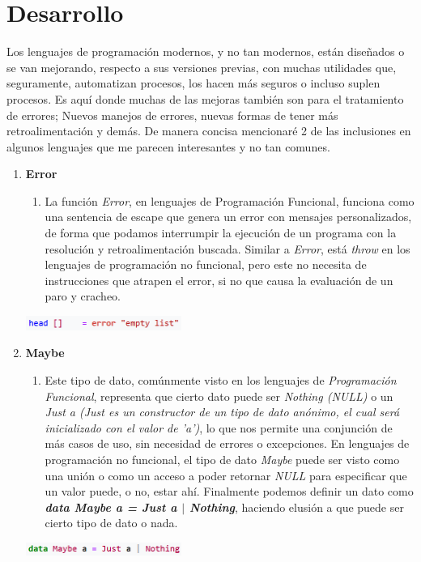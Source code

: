 \documentclass{dense_template}
\begin{document}
\section{Desarrollo}
Los lenguajes de programación modernos, y no tan modernos, están diseñados o se van mejorando, respecto a sus versiones previas, con muchas utilidades que, seguramente, automatizan procesos, los hacen más seguros o incluso suplen procesos. Es aquí donde muchas de las mejoras también son para el tratamiento de errores; Nuevos manejos de errores, nuevas formas de tener más retroalimentación y demás. De manera concisa mencionaré 2 de las inclusiones en algunos lenguajes que me parecen interesantes y no tan comunes.
\begin{enumerate}
    \item \textbf{Error}
    \begin{enumerate}
        \item La función \textit{Error}, en lenguajes de Programación Funcional, funciona como una sentencia de escape que genera un error con mensajes personalizados, de forma que podamos interrumpir la ejecución de un programa con la resolución y retroalimentación buscada. Similar a \textit{Error}, está \textit{throw} en los lenguajes de programación no funcional, pero este no necesita de instrucciones que atrapen el error, si no que causa la evaluación de un paro y cracheo.
    \end{enumerate}
    \begin{center}
        \vspace{0.5cm}
        \includegraphics[width=0.4\textwidth]{error.png}
    \end{center}
    \item \textbf{Maybe}
    \begin{enumerate}
        \item Este tipo de dato, comúnmente visto en los lenguajes de \textit{Programación Funcional}, representa que cierto dato puede ser \textit{Nothing (NULL)} o un \textit{Just a (Just es un constructor de un tipo de dato anónimo, el cual será inicializado con el valor de 'a')}, lo que nos permite una conjunción de más casos de uso, sin necesidad de errores o excepciones. En lenguajes de programación no funcional, el tipo de dato \textit{Maybe} puede ser visto como una unión o como un acceso a poder retornar \textit{NULL} para especificar que un valor puede, o no, estar ahí. Finalmente podemos definir un dato como \textit{\textbf{data Maybe a = Just a $\mid$  Nothing}}, haciendo elusión a que puede ser cierto tipo de dato o nada.
    \end{enumerate}
        \begin{center}
        \vspace{0.5cm}
        \includegraphics[width=0.4\textwidth]{Maybe.png}
    \end{center}
\end{enumerate}
\pagebreak
\end{document}
